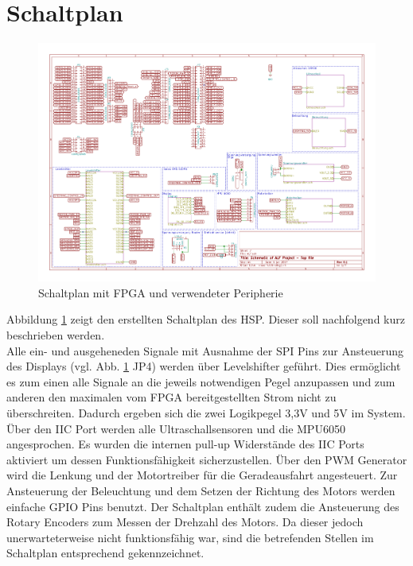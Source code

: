 \section{Schaltplan}

\begin{figure}
	\includegraphics[angle=90, height=\textheight]{Abb/Garfield_Circuit.pdf}
	\caption{Schaltplan mit FPGA und verwendeter Peripherie}
	\label{Garfield_Circuit}
\end{figure}
Abbildung \ref{Garfield_Circuit} zeigt den erstellten Schaltplan des HSP. Dieser soll nachfolgend kurz beschrieben werden.\\
Alle ein- und ausgeheneden Signale mit Ausnahme der SPI Pins zur Ansteuerung des Displays (vgl. Abb. \ref{Garfield_Circuit} JP4) werden über Levelshifter geführt. Dies ermöglicht es zum einen alle Signale an die jeweils notwendigen Pegel anzupassen und zum anderen den maximalen vom FPGA bereitgestellten Strom nicht zu überschreiten. Dadurch ergeben sich die zwei Logikpegel 3,3V und 5V im System. Über den IIC Port werden alle Ultraschallsensoren und die MPU6050 angesprochen. Es wurden die internen pull-up Widerstände des IIC Ports aktiviert um dessen Funktionsfähigkeit sicherzustellen. Über den PWM Generator wird die Lenkung und der Motortreiber für die Geradeausfahrt angesteuert. Zur Ansteuerung der Beleuchtung und dem Setzen der Richtung des Motors werden einfache GPIO Pins benutzt. Der Schaltplan enthält zudem die Ansteuerung des Rotary Encoders zum Messen der Drehzahl des Motors. Da dieser jedoch unerwarteterweise nicht funktionsfähig war, sind die betrefenden Stellen im Schaltplan entsprechend gekennzeichnet.
